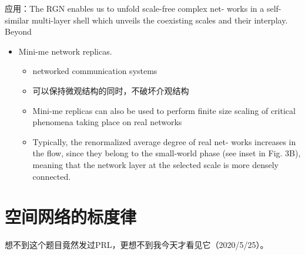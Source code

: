 应用：The RGN enables us to unfold scale-free complex net- works in a
self-similar multi-layer shell which unveils the coexisting scales and
their interplay. Beyond

\begin{itemize}
\item
  Mini-me network replicas.

  \begin{itemize}
  \item
    networked communication systems
  \item
    可以保持微观结构的同时，不破坏介观结构
  \item
    Mini-me replicas can also be used to perform finite size scaling of
    critical phenomena taking place on real networks
  \item
    Typically, the renormalized average degree of real net- works
    increases in the flow, since they belong to the small-world phase
    (see inset in Fig. 3B), meaning that the network layer at the
    selected scale is more densely connected.
  \end{itemize}
\end{itemize}

\section{空间网络的标度律}

想不到这个题目竟然发过PRL，更想不到我今天才看见它（2020/5/25）。